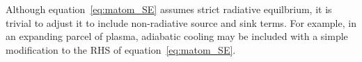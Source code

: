Although equation~\ref{eq:matom_SE} assumes strict radiative equilbrium,
it is trivial to adjust it to include non-radiative source and sink terms. 
For example, in an expanding parcel of plasma, adiabatic cooling may be 
included with a simple modification to the RHS of equation~\ref{eq:matom_SE}.





 

